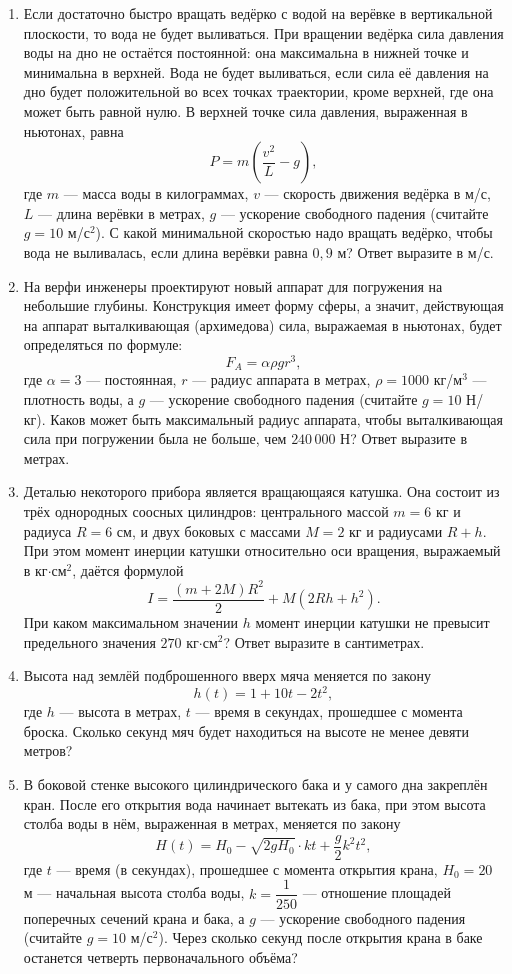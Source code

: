 \documentclass[a4paper,12pt]{article}
\begin{document}
\begin{enumerate}[label=\textcolor{accent}{\textbf{\arabic*.}},leftmargin=*,itemsep=13pt,parsep=4pt]
\newpage\item Если достаточно быстро вращать ведёрко с водой на верёвке в вертикальной плоскости, то вода не будет выливаться. При вращении ведёрка сила давления воды на дно не остаётся постоянной: она максимальна в нижней точке и минимальна в верхней. Вода не будет выливаться, если сила её давления на дно будет положительной во всех точках траектории, кроме верхней, где она может быть равной нулю. В верхней точке сила давления, выраженная в ньютонах, равна
\[
 P=m\left(\frac{v^2}{L}-g\right),
\]
где $m$ --- масса воды в килограммах, $v$ --- скорость движения ведёрка в м/с, $L$ --- длина верёвки в метрах, $g$ --- ускорение свободного падения (считайте $g=10$ м/с$^2$). С какой минимальной скоростью надо вращать ведёрко, чтобы вода не выливалась, если длина верёвки равна $0{,}9$ м? Ответ выразите в м/с.

\item На верфи инженеры проектируют новый аппарат для погружения на небольшие глубины. Конструкция имеет форму сферы, а значит, действующая на аппарат выталкивающая (архимедова) сила, выражаемая в ньютонах, будет определяться по формуле:
\[
 F_A=\alpha\rho gr^3,
\]
где $\alpha=3$ --- постоянная, $r$ --- радиус аппарата в метрах, $\rho=1000$ кг/м$^3$ --- плотность воды, а $g$ --- ускорение свободного падения (считайте $g=10$ Н/кг). Каков может быть максимальный радиус аппарата, чтобы выталкивающая сила при погружении была не больше, чем $240\,000$ Н? Ответ выразите в метрах.

\item Деталью некоторого прибора является вращающаяся катушка. Она состоит из трёх однородных соосных цилиндров: центрального массой $m=6$ кг и радиуса $R=6$ см, и двух боковых с массами $M=2$ кг и радиусами $R+h$. При этом момент инерции катушки относительно оси вращения, выражаемый в кг$\cdot$см$^2$, даётся формулой
\[
 I=\frac{(m+2M)R^2}{2}+M(2Rh+h^2).
\]
При каком максимальном значении $h$ момент инерции катушки не превысит предельного значения $270$ кг$\cdot$см$^2$? Ответ выразите в сантиметрах.

\newpage\item Высота над землёй подброшенного вверх мяча меняется по закону
\[
 h(t)=1+10t-2t^2,
\]
где $h$ --- высота в метрах, $t$ --- время в секундах, прошедшее с момента броска. Сколько секунд мяч будет находиться на высоте не менее девяти метров?

\item В боковой стенке высокого цилиндрического бака и у самого дна закреплён кран. После его открытия вода начинает вытекать из бака, при этом высота столба воды в нём, выраженная в метрах, меняется по закону
\[
 H(t)=H_0-\sqrt{2gH_0}\cdot kt+\frac{g}{2}k^2t^2,
\]
где $t$ --- время (в секундах), прошедшее с момента открытия крана, $H_0=20$ м --- начальная высота столба воды, $k=\dfrac1{250}$ --- отношение площадей поперечных сечений крана и бака, а $g$ --- ускорение свободного падения (считайте $g=10$ м/с$^2$). Через сколько секунд после открытия крана в баке останется четверть первоначального объёма?


\end{enumerate}
\end{document}
